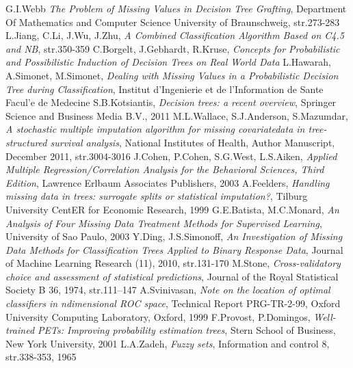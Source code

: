 \documentclass[a4paper,11pt,twoside]{report}
\theoremstyle{definition}
\begin{document}
\begin{thebibliography}{25}
 G.I.Webb \textit{The Problem of Missing Values in Decision Tree Grafting}, Department Of Mathematics and Computer Science University of Braunschweig, str.273-283
 L.Jiang, C.Li, J.Wu, J.Zhu, \textit{A Combined Classification Algorithm Based on C4.5 and NB}, str.350-359
 C.Borgelt, J.Gebhardt, R.Kruse, \textit{Concepts for Probabilistic and Possibilistic Induction of Decision Trees on Real World Data}
 L.Hawarah, A.Simonet, M.Simonet, \textit{Dealing with Missing Values in a Probabilistic Decision Tree during Classification}, Institut d'Ingenierie et de l'Information de Sante Facul'e de Medecine 
 S.B.Kotsiantis, \textit{Decision trees: a recent overview}, Springer Science and Business Media B.V., 2011
 M.L.Wallace, S.J.Anderson, S.Mazumdar, \textit{A stochastic multiple imputation algorithm for missing covariatedata in tree-structured survival analysis}, National Institutes of Health, Author Manuscript, December 2011, str.3004-3016
 J.Cohen, P.Cohen, S.G.West, L.S.Aiken, \textit{Applied Multiple Regression/Correlation Analysis for the Behavioral Sciences, Third Edition}, Lawrence Erlbaum Associates Publishers, 2003 
 A.Feelders, \textit{Handling missing data in trees: surrogate splits or statistical imputation?}, Tilburg University CentER for Economic Research, 1999
 G.E.Batista, M.C.Monard, \textit{An Analysis of Four Missing Data Treatment Methods for Supervised Learning}, University of Sao Paulo, 2003
 Y.Ding, J.S.Simonoff, \textit{An Investigation of Missing Data Methods for Classification Trees Applied to Binary Response Data}, Journal of Machine Learning Research (11), 2010, str.131-170
 M.Stone, \textit{Cross-validatory choice and assessment of statistical predictions}, Journal of the Royal Statistical Society B 36, 1974, str.111–147
 A.Svinivasan, \textit{Note on the location of optimal classifiers in ndimensional ROC space}, Technical Report PRG-TR-2-99, Oxford University Computing Laboratory, Oxford, 1999 
 F.Provost, P.Domingos, \textit{Well-trained PETs: Improving probability estimation trees}, Stern School of Business, New York University, 2001 
 L.A.Zadeh, \textit{Fuzzy sets}, Information and control 8, str.338-353, 1965 

\end{thebibliography}

\thispagestyle{empty}


\end{document}
